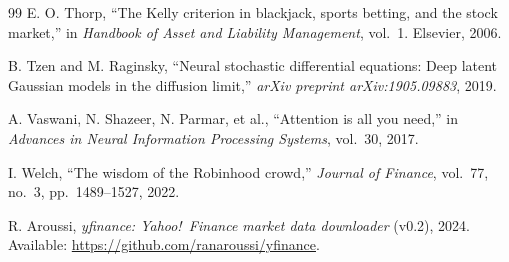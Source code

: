 \documentclass[10pt,twocolumn]{article}
\begin{document}
\begin{thebibliography}{99}
E. O. Thorp,
``The Kelly criterion in blackjack, sports betting, and the stock market,''
in \textit{Handbook of Asset and Liability Management}, vol.~1.
Elsevier, 2006.

B. Tzen and M. Raginsky,
``Neural stochastic differential equations: Deep latent Gaussian models in the diffusion limit,''
\textit{arXiv preprint arXiv:1905.09883}, 2019.

A. Vaswani, N. Shazeer, N. Parmar, et al.,
``Attention is all you need,''
in \textit{Advances in Neural Information Processing Systems}, vol.~30, 2017.

I. Welch,
``The wisdom of the Robinhood crowd,''
\textit{Journal of Finance}, vol.~77, no.~3, pp.~1489--1527, 2022.

R. Aroussi,
\textit{yfinance: Yahoo!\ Finance market data downloader} (v0.2),
2024. Available: \url{https://github.com/ranaroussi/yfinance}.

\end{thebibliography}
\end{document}
